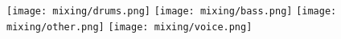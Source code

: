 \texttt{[image: mixing/drums.png]}
\texttt{[image: mixing/bass.png]}
\texttt{[image: mixing/other.png]}
\texttt{[image: mixing/voice.png]}
